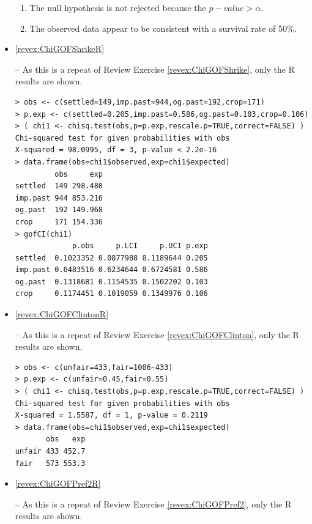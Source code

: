 \documentclass[10pt,openany]{book}\usepackage[]{graphicx}\usepackage[]{color}
\makeatletter
\newenvironment{kframe}{%
 \def\at@end@of@kframe{}%
 \ifinner\ifhmode%
  \def\at@end@of@kframe{\end{minipage}}%
  \begin{minipage}{\columnwidth}%
 \fi\fi%
 \def\FrameCommand##1{\hskip\@totalleftmargin \hskip-\fboxsep
 \colorbox{shadecolor}{##1}\hskip-\fboxsep
     \hskip-\linewidth \hskip-\@totalleftmargin \hskip\columnwidth}%
 \MakeFramed {\advance\hsize-\width
   \@totalleftmargin\z@ \linewidth\hsize
   \@setminipage}}%
 {\par\unskip\endMakeFramed%
 \at@end@of@kframe}
\newenvironment{knitrout}{}{} %
\makeatother
\begin{document}
\begin{itemize}
\begin{enumerate}
      \item The null hypothesis is not rejected because the $p-value>\alpha$.
      \item The observed data appear to be consistent with a survival rate of 50\%.
  \end{enumerate}
  \item \hypertarget{ans:ChiGOFShrikeR}{\ref{revex:ChiGOFShrikeR}} -- As this is a repeat of Review Exercise \ref{revex:ChiGOFShrike}, only the R results are shown.
\begin{knitrout}
\color{fgcolor}\begin{kframe}
\begin{verbatim}
> obs <- c(settled=149,imp.past=944,og.past=192,crop=171)
> p.exp <- c(settled=0.205,imp.past=0.586,og.past=0.103,crop=0.106)
> ( chi1 <- chisq.test(obs,p=p.exp,rescale.p=TRUE,correct=FALSE) )
Chi-squared test for given probabilities with obs 
X-squared = 98.0995, df = 3, p-value < 2.2e-16
> data.frame(obs=chi1$observed,exp=chi1$expected)
         obs     exp
settled  149 298.480
imp.past 944 853.216
og.past  192 149.968
crop     171 154.336
> gofCI(chi1)
             p.obs     p.LCI     p.UCI p.exp
settled  0.1023352 0.0877988 0.1189644 0.205
imp.past 0.6483516 0.6234644 0.6724581 0.586
og.past  0.1318681 0.1154535 0.1502202 0.103
crop     0.1174451 0.1019059 0.1349976 0.106
\end{verbatim}
\end{kframe}
\end{knitrout}
  \item \hypertarget{ans:ChiGOFClintonR}{\ref{revex:ChiGOFClintonR}} -- As this is a repeat of Review Exercise \ref{revex:ChiGOFClinton}, only the R results are shown.
\begin{knitrout}
\color{fgcolor}\begin{kframe}
\begin{verbatim}
> obs <- c(unfair=433,fair=1006-433)
> p.exp <- c(unfair=0.45,fair=0.55)
> ( chi1 <- chisq.test(obs,p=p.exp,rescale.p=TRUE,correct=FALSE) )
Chi-squared test for given probabilities with obs 
X-squared = 1.5587, df = 1, p-value = 0.2119
> data.frame(obs=chi1$observed,exp=chi1$expected)
       obs   exp
unfair 433 452.7
fair   573 553.3
\end{verbatim}
\end{kframe}
\end{knitrout}
  \item \hypertarget{ans:ChiGOFPref2R}{\ref{revex:ChiGOFPref2R}} -- As this is a repeat of Review Exercise \ref{revex:ChiGOFPref2}, only the R results are shown.

\end{itemize}
\end{document}
